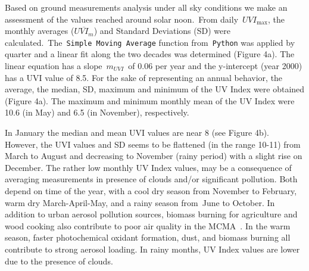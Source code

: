 \documentclass{article}
\begin{document}
Based on ground measurements analysis under all sky conditions we make
an assessment of the values reached around solar noon.~From
daily~\(UVI_{\max}\), the monthly averages (\(\overline{UVI_m}\)) and
Standard Deviations (SD) were
calculated.~The~\texttt{Simple\ Moving\ Average} function
from~\texttt{Python} was applied by quarter and a linear fit along the
two decades was determined (Figure 4a).%
The linear equation has a slope~\(m_{UVI}\)~of 0.06 per year and
the y-intercept (year 2000) has a UVI value of 8.5. For the sake of
representing an annual behavior, the average, the median, SD, maximum
and minimum of the UV Index were obtained
(Figure 4a).%
 The maximum and minimum
monthly mean of the UV Index were 10.6 (in May) and 6.5 (in November),
respectively.

In January the median and mean UVI values are near 8 (see Figure 4b).%
However, the UVI values and SD
seems to be flattened (in the range 10-11) from March to August and
decreasing to November (rainy period) with a slight rise on December.
The rather low monthly UV Index values, may be a consequence of
averaging measurements in presence of clouds and/or significant
pollution. Both depend on time of the year, with a cool dry season from
November to February, warm dry March-April-May, and a rainy season
from~June to October. In addition to urban aerosol pollution sources,
biomass burning for agriculture and wood cooking also contribute to poor
air quality in the MCMA~\cite{Retama_2015}. In the warm season, faster
photochemical oxidant formation, dust, and biomass burning all
contribute to strong aerosol loading. In rainy months, UV Index values
are lower due to the presence of clouds.~
\end{document}

